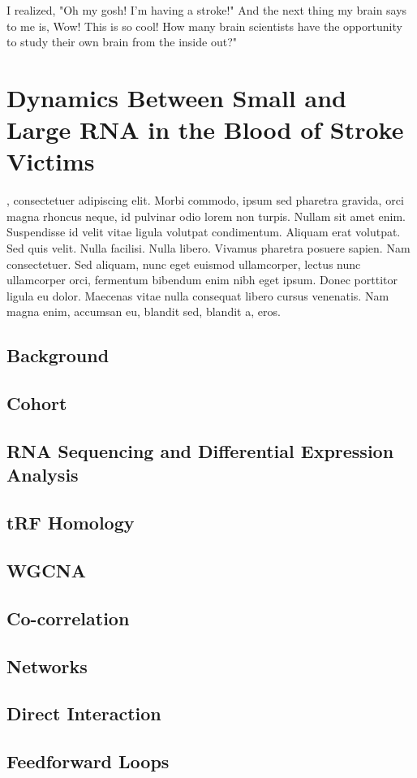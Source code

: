 \begin{savequote}[75mm]
I realized, "Oh my gosh! I'm having a stroke!" And the next thing my brain says to me is, Wow! This is so cool! How many brain scientists have the opportunity to study their own brain from the inside out?"
\end{savequote}

\chapter{Dynamics Between Small and Large RNA in the Blood of Stroke Victims}

, consectetuer adipiscing elit. Morbi commodo, ipsum sed pharetra gravida, orci magna rhoncus neque, id pulvinar odio lorem non turpis. Nullam sit amet enim. Suspendisse id velit vitae ligula volutpat condimentum. Aliquam erat volutpat. Sed quis velit. Nulla facilisi. Nulla libero. Vivamus pharetra posuere sapien. Nam consectetuer. Sed aliquam, nunc eget euismod ullamcorper, lectus nunc ullamcorper orci, fermentum bibendum enim nibh eget ipsum. Donec porttitor ligula eu dolor. Maecenas vitae nulla consequat libero cursus venenatis. Nam magna enim, accumsan eu, blandit sed, blandit a, eros.

\section{Background}
\section{Cohort}
\section{RNA Sequencing and Differential Expression Analysis}
\section{tRF Homology}
\section{WGCNA}
\section{Co-correlation}
\section{Networks}
\section{Direct Interaction}
\section{Feedforward Loops} \label{sec:stroke:ffl}

